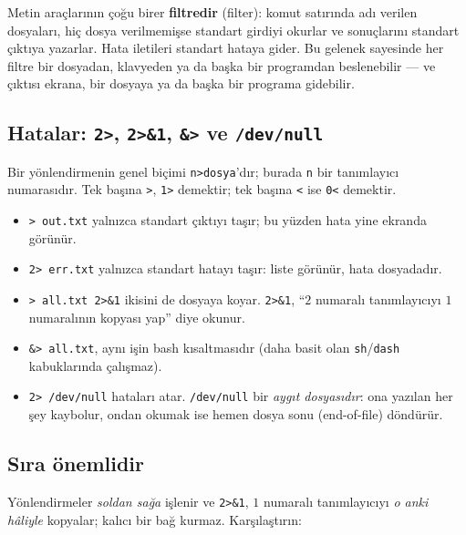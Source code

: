 \documentclass[11pt,a4paper]{article}
\newcommand{\term}[1]{\textbf{\color{mintdeep}#1}}
\newcommand{\cmd}[1]{\texttt{#1}}
\begin{document}
\begin{keyidea}
Metin araçlarının çoğu birer \term{filtredir} (filter): komut satırında adı verilen dosyaları, hiç dosya verilmemişse standart girdiyi okurlar ve sonuçlarını standart çıktıya yazarlar. Hata iletileri standart hataya gider. Bu gelenek sayesinde her filtre bir dosyadan, klavyeden ya da başka bir programdan beslenebilir --- ve çıktısı ekrana, bir dosyaya ya da başka bir programa gidebilir.
\end{keyidea}

\subsection{Hatalar: \texttt{2>}, \texttt{2>\&1}, \texttt{\&>} ve \texttt{/dev/null}}

Bir yönlendirmenin genel biçimi \texttt{n>dosya}'dır; burada \texttt{n} bir tanımlayıcı numarasıdır. Tek başına \texttt{>}, \texttt{1>} demektir; tek başına \texttt{<} ise \texttt{0<} demektir.




\begin{itemize}
  \item \cmd{> out.txt} yalnızca standart çıktıyı taşır; bu yüzden hata yine ekranda görünür.
  \item \cmd{2> err.txt} yalnızca standart hatayı taşır: liste görünür, hata dosyadadır.
  \item \cmd{> all.txt 2>\&1} ikisini de dosyaya koyar. \cmd{2>\&1}, ``$2$ numaralı tanımlayıcıyı $1$ numaralının kopyası yap'' diye okunur.
  \item \cmd{\&> all.txt}, aynı işin bash kısaltmasıdır (daha basit olan \cmd{sh}/\cmd{dash} kabuklarında çalışmaz).
  \item \cmd{2> /dev/null} hataları atar. \texttt{/dev/null} bir \emph{aygıt dosyasıdır}: ona yazılan her şey kaybolur, ondan okumak ise hemen dosya sonu (end-of-file) döndürür.
\end{itemize}

\subsection{Sıra önemlidir}

Yönlendirmeler \emph{soldan sağa} işlenir ve \cmd{2>\&1}, $1$ numaralı tanımlayıcıyı \emph{o anki hâliyle} kopyalar; kalıcı bir bağ kurmaz. Karşılaştırın:
\end{document}
